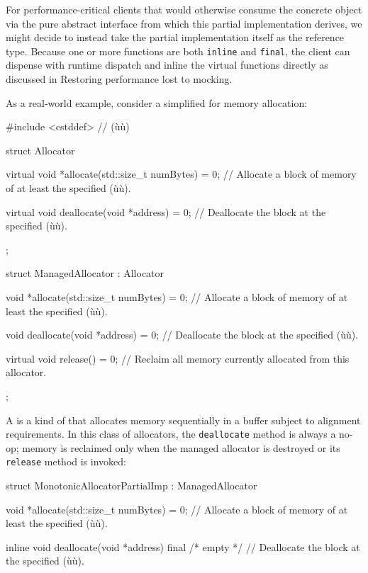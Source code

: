 {For performance-critical clients that would otherwise consume the
concrete object via the pure abstract interface from which this partial
implementation derives, we might decide to instead take the partial
implementation itself as the reference type. Because one or more
functions are both \lstinline!inline! and \lstinline!final!, the client can
dispense with runtime dispatch and inline the virtual functions directly
as discussed in {Restoring performance lost to mocking}.

As a real-world example, consider a simplified  for memory allocation:

\begin{emcppslisting}[emcppsbatch=e7]
#include <cstddef>  // (ù{}ù)

struct Allocator
{
    virtual void *allocate(std::size_t numBytes) = 0;
        // Allocate a block of memory of at least the specified (ù{}ù).

    virtual void deallocate(void *address) = 0;
        // Deallocate the block at the specified (ù{}ù).
};

struct ManagedAllocator : Allocator
{
    void *allocate(std::size_t numBytes) = 0;
        // Allocate a block of memory of at least the specified (ù{}ù).

    void deallocate(void *address) = 0;
        // Deallocate the block at the specified (ù{}ù).

    virtual void release() = 0;
        // Reclaim all memory currently allocated from this allocator.
};
\end{emcppslisting}
    

\noindent A  is a kind of 
that allocates memory sequentially in a buffer subject to alignment
requirements. In this class of allocators, the \lstinline!deallocate!
method is always a no-op; memory is reclaimed only when the managed
allocator is destroyed or its \lstinline!release! method is invoked:

\begin{emcppslisting}[emcppsbatch=e7]
struct MonotonicAllocatorPartialImp : ManagedAllocator
{
    void *allocate(std::size_t numBytes) = 0;
        // Allocate a block of memory of at least the specified (ù{}ù).

    inline void deallocate(void *address) final { /* empty */ }
        // Deallocate the block at the specified (ù{}ù).

}
\end{emcppslisting}}
